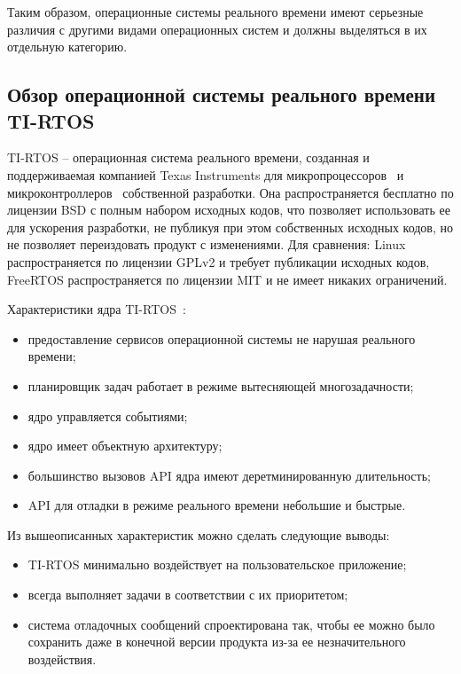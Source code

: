 
Таким образом, операционные системы реального времени имеют серьезные различия
с другими видами операционных систем и должны выделяться в их отдельную
категорию.

\subsection{Обзор операционной системы реального времени TI-RTOS}

TI-RTOS -- операционная система реального времени, созданная и поддерживаемая
компанией Texas Instruments для микропроцессоров~\cite{tirtos_proc_site} и
микроконтроллеров~\cite{tirtos_mcu_site} собственной разработки. Она
распространяется бесплатно по лицензии BSD с полным набором исходных кодов,
что позволяет использовать ее для ускорения разработки,
не публикуя при этом собственных исходных кодов, но не позволяет переиздовать
продукт с изменениями. Для сравнения:
Linux распространяется по лицензии GPLv2 и требует публикации
исходных кодов, FreeRTOS распространяется по лицензии MIT и не имеет никаких
ограничений.

Характеристики ядра TI-RTOS~\cite{ma_tirtos_kernel}:
\begin{itemize}
    \item предоставление сервисов операционной системы не нарушая реального времени;
    \item планировщик задач работает в режиме вытесняющей многозадачности;
    \item ядро управляется событиями;
    \item ядро имеет объектную архитектуру;
    \item большинство вызовов API ядра имеют деретминированную длительность;
    \item API для отладки в режиме реального времени небольшие и быстрые.
\end{itemize}

Из вышеописанных характеристик можно сделать следующие выводы:
\begin{itemize}
    \item TI-RTOS минимально воздействует на пользовательское приложение;
    \item всегда выполняет задачи в соответствии с их приоритетом;
    \item система отладочных сообщений спроектирована так, чтобы ее можно было
        сохранить даже в конечной версии продукта из-за ее незначительного воздействия.
\end{itemize}

